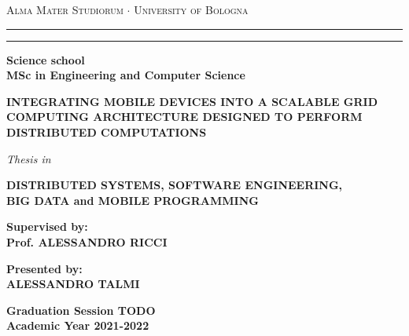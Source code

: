 \begin{titlepage}
    \begin{center}
    {{\Large{
        \textsc{Alma Mater Studiorum $\cdot$ University of Bologna}
    }}}
    \rule[0.1cm]{15.8cm}{0.1mm}
    \rule[0.5cm]{15.8cm}{0.6mm}
    {\small{\bf Science school\\ 
    MSc in Engineering and Computer Science }}
    \vspace{15mm}
    \end{center}
    \begin{center}
        \huge\bf INTEGRATING MOBILE DEVICES INTO A SCALABLE GRID COMPUTING ARCHITECTURE DESIGNED TO PERFORM DISTRIBUTED COMPUTATIONS
    \end{center}
    \vspace{15mm}
    \begin{center}
    {{\emph{Thesis in}}}
    
    \vspace{1mm}
    {{\bf{DISTRIBUTED SYSTEMS, SOFTWARE ENGINEERING,\\BIG DATA and MOBILE PROGRAMMING}}}
    \vspace{18mm}
    \end{center}
    \par
    \noindent
    \begin{minipage}[t]{0.47\textwidth}
    {\large{\bf Supervised by:\\
    Prof. ALESSANDRO RICCI}}
    \end{minipage}
    \hfill
    \begin{minipage}[t]{0.47\textwidth}\raggedleft
    {\large{\bf Presented by:\\
    ALESSANDRO TALMI}}
    \end{minipage}
    \vspace{20mm}
    \begin{center}
    {\large{\bf Graduation Session TODO\\
    Academic Year 2021-2022}}
    \end{center}
\end{titlepage}
